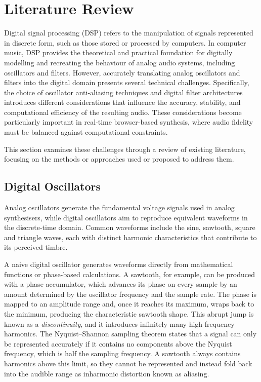 \section{Literature Review}
\noindent
Digital signal processing (DSP) refers to the manipulation of signals represented
in discrete form, such as those stored or processed by computers. In computer music, DSP 
provides the theoretical and practical foundation for digitally modelling and recreating the 
behaviour of analog audio systems, including oscillators and filters. However, accurately 
translating analog oscillators and filters into the digital domain presents several technical 
challenges. Specifically, the choice of oscillator anti-aliasing techniques and digital filter 
architectures introduces different considerations that influence the accuracy, stability, and 
computational efficiency of the resulting audio. These considerations become particularly 
important in real-time browser-based synthesis, where audio fidelity must be balanced against 
computational constraints.

This section examines these challenges through a review of existing 
literature, focusing on the methods or approaches used or proposed to address them.

\subsection{Digital Oscillators}
\noindent
Analog oscillators generate the fundamental voltage signals used in analog synthesisers,
while digital oscillators aim to reproduce equivalent waveforms in the discrete-time domain.
Common waveforms include the sine, sawtooth, square and triangle waves, each with distinct
harmonic characteristics that contribute to its perceived timbre.

A naive digital oscillator generates waveforms directly from mathematical functions or
phase-based calculations. A sawtooth, for example, can be produced with a phase accumulator,
which advances its phase on every sample by an amount determined by the oscillator frequency
and the sample rate. The phase is mapped to an amplitude range and, once it reaches its
maximum, wraps back to the minimum, producing the characteristic sawtooth shape. This abrupt
jump is known as a \textit{discontinuity}, and it introduces infinitely many high-frequency 
harmonics. The
Nyquist--Shannon sampling theorem states that a signal can only be represented accurately if
it contains no components above the Nyquist frequency, which is half the sampling frequency.
A sawtooth always contains harmonics above this limit, so they cannot be represented and
instead fold back into the audible range as inharmonic distortion known as aliasing.

